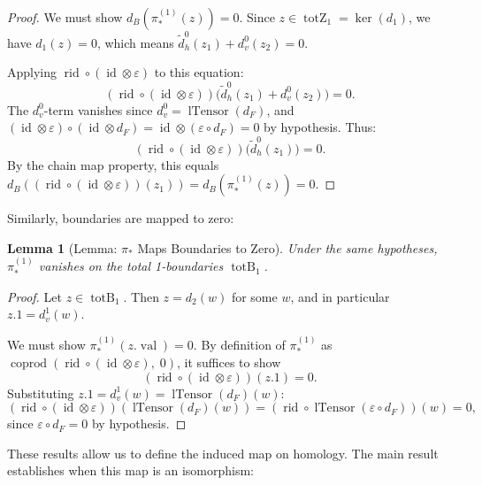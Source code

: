 \documentclass[11pt]{article}
\theoremstyle{plain}
\newtheorem*{lemma}{Lemma}
\theoremstyle{definition}
\theoremstyle{remark}
\renewcommand{\ker}{\operatorname{ker}}
\begin{document}
\begin{proof}
We must show $d_B(\pi_*^{(1)}(z)) = 0$. Since $z \in \operatorname{totZ}_1 = \ker(d_1)$, we have $d_1(z) = 0$, which means $\widetilde{d}_h^0(z_1) + d_v^0(z_2) = 0$.

Applying $\operatorname{rid} \circ (\operatorname{id} \otimes \varepsilon)$ to this equation:
\[
(\operatorname{rid} \circ (\operatorname{id} \otimes \varepsilon))\bigl(\widetilde{d}_h^0(z_1) + d_v^0(z_2)\bigr) = 0.
\]
The $d_v^0$-term vanishes since $d_v^0 = \operatorname{lTensor}(d_F)$, and $(\operatorname{id} \otimes \varepsilon) \circ (\operatorname{id} \otimes d_F) = \operatorname{id} \otimes (\varepsilon \circ d_F) = 0$ by hypothesis. Thus:
\[
(\operatorname{rid} \circ (\operatorname{id} \otimes \varepsilon))\bigl(\widetilde{d}_h^0(z_1)\bigr) = 0.
\]
By the chain map property, this equals $d_B((\operatorname{rid} \circ (\operatorname{id} \otimes \varepsilon))(z_1)) = d_B(\pi_*^{(1)}(z)) = 0$.
\end{proof}

Similarly, boundaries are mapped to zero:

\begin{lemma}[Lemma: $\pi_*$ Maps Boundaries to Zero]
Under the same hypotheses, $\pi_*^{(1)}$ vanishes on the total 1-boundaries $\operatorname{totB}_1$.
\end{lemma}

\begin{proof}
Let $z \in \operatorname{totB}_1$. Then $z = d_2(w)$ for some $w$, and in particular $z.1 = d_v^1(w)$.

We must show $\pi_*^{(1)}(z.\operatorname{val}) = 0$. By definition of $\pi_*^{(1)}$ as $\operatorname{coprod}(\operatorname{rid} \circ (\operatorname{id} \otimes \varepsilon),\; 0)$, it suffices to show
\[
(\operatorname{rid} \circ (\operatorname{id} \otimes \varepsilon))(z.1) = 0.
\]
Substituting $z.1 = d_v^1(w) = \operatorname{lTensor}(d_F)(w)$:
\[
(\operatorname{rid} \circ (\operatorname{id} \otimes \varepsilon))(\operatorname{lTensor}(d_F)(w)) = (\operatorname{rid} \circ \operatorname{lTensor}(\varepsilon \circ d_F))(w) = 0,
\]
since $\varepsilon \circ d_F = 0$ by hypothesis.
\end{proof}

These results allow us to define the induced map on homology. The main result establishes when this map is an isomorphism:
\end{document}
